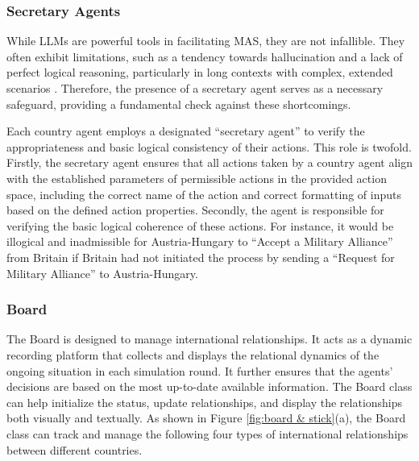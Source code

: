 \documentclass{article}
\begin{document}
\subsubsection{Secretary Agents}
While LLMs are powerful tools in facilitating MAS, they are not infallible. They often exhibit limitations, such as a tendency towards hallucination and a lack of perfect logical reasoning, particularly in long contexts with complex, extended scenarios \cite{liu2023lost, yang2023can}. Therefore, the presence of a secretary agent serves as a necessary safeguard, providing a fundamental check against these shortcomings.

Each country agent employs a designated ``secretary agent'' to verify the appropriateness and basic logical consistency of their actions. This role is twofold. Firstly, the secretary agent ensures that all actions taken by a country agent align with the established parameters of permissible actions in the provided action space, including the correct name of the action and correct formatting of inputs based on the defined action properties. Secondly, the agent is responsible for verifying the basic logical coherence of these actions. For instance, it would be illogical and inadmissible for Austria-Hungary to ``Accept a Military Alliance'' from Britain if Britain had not initiated the process by sending a ``Request for Military Alliance'' to Austria-Hungary.

\subsubsection{Board}
The Board is designed to manage international relationships. It acts as a dynamic recording platform that collects and displays the relational dynamics of the ongoing situation in each simulation round. It further ensures that the agents' decisions are based on the most up-to-date available information. The Board class can help initialize the status, update relationships, and display the relationships both visually and textually. As shown in Figure \ref{fig:board & stick}(a), the Board class can track and manage the following four types of international relationships between different countries. 
\end{document}
